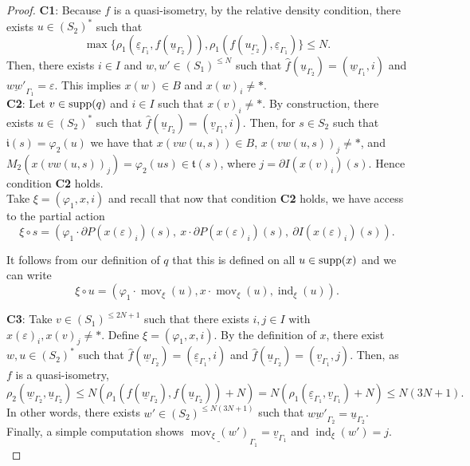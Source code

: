 \documentclass{article}
\theoremstyle{definition}
\theoremstyle{definition}
\newcommand{\init}{\mathfrak{i}}
\newcommand{\ter}{\mathfrak{t}}
\newcommand{\mov}{\operatorname{mov}}
\newcommand{\ind}{\operatorname{ind}}
\newcommand{\supp}{\textnormal{supp}}
\begin{document}
\begin{proof}
 \noindent
 \textbf{C1}: Because $f$ is a quasi-isometry, by the relative density condition, there exists $u\in (S_2)^*$ such that 
 $$\max\{\rho_1(\underline{\varepsilon}_{\Gamma_1}, f(\underline{u}_{\Gamma_2})),\rho_1(f(\underline{u_{\Gamma_2}}),\underline{\varepsilon}_{\Gamma_1})\}\leq N.$$
 Then, there exists $i\in I$ and $w,w'\in (S_1)^{\leq N}$ such that $\widehat{f}(\underline{u}_{\Gamma_2}) = (\underline{w}_{\Gamma_1},i)$ and $\underline{ww'}_{\Gamma_1} = \varepsilon$. This implies $x(w)\in B$ and $x(w)_i\neq\ast$.\\

 \noindent
 \textbf{C2}: Let $v\in \supp(q)$ and $i\in I$ such that $x(v)_i\neq \ast$. By construction, there exists $u\in (S_2)^*$ such that $\widehat{f}(\underline{u}_{\Gamma_2}) = (\underline{v}_{\Gamma_1},i)$. Then, for $s\in S_2$ such that $\init(s) = \varphi_2(u)$ we have that $x(vw(u,s))\in B$, $x(vw(u,s))_j \neq \ast$, and $M_2(x(vw(u,s))_j) = \varphi_2(us)\in\ter(s)$, where $ j =\partial I (x(v)_i)(s)$. Hence condition \textbf{C2} holds. \\

 Take $\xi = (\varphi_1,x,i)$ and recall that now that condition \textbf{C2} holds, we have access to the partial action
 $$\xi \circ s = \left(\varphi_1\cdot \partial P(x(\varepsilon)_{i})(s),\ x\cdot \partial P(x(\varepsilon)_{i})(s),\ \partial I(x(\varepsilon)_{i})(s)\right).$$
 
 It follows from our definition of $q$ that this is defined on all $u \in \supp(x)$ and we can write
 \[ \xi\circ u = (\varphi_1 \cdot \mov_{\xi}(u), x\cdot \mov_{\xi}(u), \ind_{\xi}(u)). \]

 
 \noindent
 \textbf{C3}: Take $v\in (S_1)^{\leq 2N+1}$ such that there exists $i,j\in I$ with $x(\varepsilon)_i,x(v)_j\neq\ast$. Define $\xi = (\varphi_1,x,i)$. By the definition of $x$, there exist $w, u\in (S_2)^*$ such that $\widehat{f}(\underline{w}_{\Gamma_2}) = (\underline{\varepsilon}_{\Gamma_1},i)$ and $\widehat{f}(\underline{u}_{\Gamma_2})=(\underline{v}_{\Gamma_1},j)$. Then, as $f$ is a quasi-isometry, 
 $$\rho_2(\underline{w}_{\Gamma_2},\underline{u}_{\Gamma_2})\leq N(\rho_1(f(\underline{w}_{\Gamma_2}), f(\underline{u}_{\Gamma_2})) + N) = N(\rho_1(\underline{\varepsilon}_{\Gamma_1}, \underline{v}_{\Gamma_1}) + N) \leq N(3N+1).$$
In other words, there exists $w'\in (S_2)^{\leq N(3N+1)}$ such that $\underline{ww'}_{\Gamma_2}= \underline{u}_{\Gamma_2}$. Finally, a simple computation shows $\underline{\mov_{\xi}(w')}_{\Gamma_1} = \underline{v}_{\Gamma_1}$ and $\ind_{\xi}(w') = j$.\\ 


\end{proof}
\end{document}
